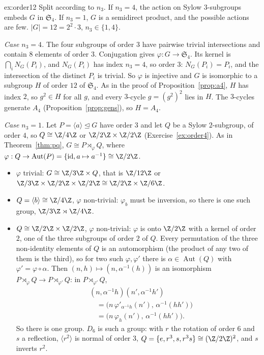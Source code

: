 \begin{solution}{ex:order12}
\idea Split according to $n_3$. If $n_3=4$, the action on Sylow $3$-subgroups embeds $G$ in $\mathfrak S_4$. If $n_3=1$, $G$ is a semidirect product, and the possible actions are few.
\writeup $|G|=12=2^2\cdot3$, $n_3\in\{1,4\}$.

\emph{Case $n_3=4$.} The four subgroups of order $3$ have pairwise trivial intersections and contain $8$ elements of order $3$. Conjugation gives $\varphi:G\to\mathfrak S_4$. Its kernel is $\bigcap_iN_G(P_i)$, and $N_G(P_i)$ has index $n_3=4$, so order $3$: $N_G(P_i)=P_i$, and the intersection of the distinct $P_i$ is trivial. So $\varphi$ is injective and $G$ is isomorphic to a subgroup $H$ of order $12$ of $\mathfrak S_4$. As in the proof of Proposition~\ref{prop:a4}, $H$ has index $2$, so $g^2\in H$ for all $g$, and every $3$-cycle $g=(g^2)^2$ lies in $H$. The $3$-cycles generate $A_4$ (Proposition~\ref{prop:gens}), so $H=A_4$.

\emph{Case $n_3=1$.} Let $P=\langle a\rangle\trianglelefteq G$ have order $3$ and let $Q$ be a Sylow $2$-subgroup, of order $4$, so $Q\cong\Z/4\Z$ or $\Z/2\Z\times\Z/2\Z$ (Exercise~\ref{ex:order4}). As in Theorem~\ref{thm:pq}, $G\cong P\rtimes_\varphi Q$, where $\varphi:Q\to\operatorname{Aut}(P)=\{\mathrm{id},a\mapsto a^{-1}\}\cong\Z/2\Z$.
\begin{itemize}
\item $\varphi$ trivial: $G\cong\Z/3\Z\times Q$, that is $\Z/12\Z$ or $\Z/3\Z\times\Z/2\Z\times\Z/2\Z\cong\Z/2\Z\times\Z/6\Z$.
\item $Q=\langle b\rangle\cong\Z/4\Z$, $\varphi$ non-trivial: $\varphi_b$ must be inversion, so there is one such group, $\Z/3\Z\rtimes\Z/4\Z$.
\item $Q\cong\Z/2\Z\times\Z/2\Z$, $\varphi$ non-trivial: $\varphi$ is onto $\Z/2\Z$ with a kernel of order $2$, one of the three subgroups of order $2$ of $Q$. Every permutation of the three non-identity elements of $Q$ is an automorphism (the product of any two of them is the third), so for two such $\varphi,\varphi'$ there is $\alpha\in\operatorname{Aut}(Q)$ with $\varphi'=\varphi\circ\alpha$. Then $(n,h)\mapsto(n,\alpha^{-1}(h))$ is an isomorphism $P\rtimes_\varphi Q\to P\rtimes_{\varphi'}Q$: in $P\rtimes_{\varphi'}Q$,
\[
\begin{aligned}
{}&(n,\alpha^{-1}h)(n',\alpha^{-1}h')\\&\quad=\bigl(n\,\varphi'_{\alpha^{-1}h}(n'),\,\alpha^{-1}(hh')\bigr)\\
&\quad=\bigl(n\,\varphi_h(n'),\,\alpha^{-1}(hh')\bigr).
\end{aligned}
\]
 So there is one group. $D_6$ is such a group: with $r$ the rotation of order $6$ and $s$ a reflection, $\langle r^2\rangle$ is normal of order $3$, $Q=\{e,r^3,s,r^3s\}\cong(\Z/2\Z)^2$, and $s$ inverts $r^2$.
\end{itemize}


\end{solution}
